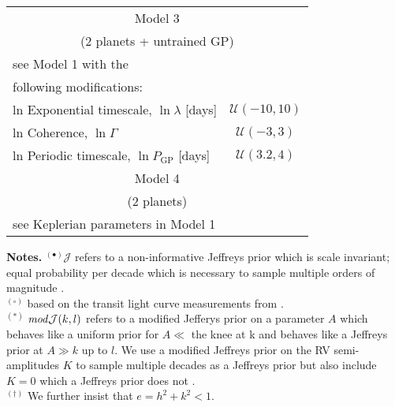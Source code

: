 \begin{table}
\begin{tabular}{lc}
\multicolumn{2}{c}{Model 3} \\
\multicolumn{2}{c}{(2 planets + untrained GP)} \smallskip \\
see Model 1  with the & \\
following modifications: & \\
ln Exponential timescale, $\ln{\lambda}$ [days] & $\mathcal{U}(-10,10)$ \\
ln Coherence, $\ln{\Gamma}$ &  $\mathcal{U}(-3,3)$ \\
ln Periodic timescale, $\ln{P_{\text{GP}}}$ [days] &  $\mathcal{U}(3.2,4)$ \medskip \\

\multicolumn{2}{c}{Model 4} \\
\multicolumn{2}{c}{(2 planets)} \smallskip \\
see Keplerian parameters in Model 1 & \\

\hline
\end{tabular}
\begin{list}{}{}
\item {\bf{Notes.}} $^{(\bullet)} \mathcal{J}$ refers to a non-informative Jeffreys prior
  which is scale invariant; equal probability per decade which is necessary to sample
  multiple orders of magnitude \citep{gregory05}. \\
  $^{(\circ)}$ based on the transit light curve measurements from . \\
  $^{(\ast)}$ $\text{\emph{mod}}\mathcal{J}(k,l)$ \mps{} 
  refers to a modified Jefferys prior on a parameter $A$ which behaves like a uniform
  prior for $A \ll$ the knee at k \mps{} and
  behaves like a Jeffreys prior at $A \gg k$ up to $l$. We use a modified Jeffreys prior on 
  the RV semi-amplitudes $K$ to sample multiple decades as a Jeffreys prior but also include
  $K=0$ \mps{} which a Jeffreys prior does not \citep{gregory05}. \\
  $^{(\dagger)}$ We further insist
  that $e = h^2 + k^2 < 1$.
\end{list}
\end{table}
